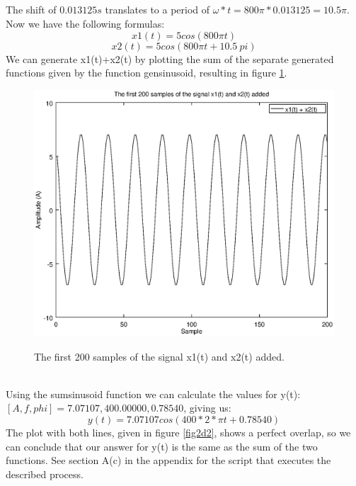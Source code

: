 \documentclass{article}
\begin{document}
\subsection{}
The shift of $0.013125s$ translates to a period of $\omega * t = 800\pi*0.013125 = 10.5\pi$. Now we have the following formulas:
\begin{equation}
    x1(t) = 5 cos(800\pi t)
\end{equation}
\begin{equation}
    x2(t) = 5 cos(800\pi t + 10.5\:pi)
\end{equation}
We can generate x1(t)+x2(t) by plotting the sum of the separate generated functions given by the function gensinusoid, resulting in figure \ref{fig2d1}.\\
\begin{figure}[H]
  \centering
  \includegraphics[width=.7\columnwidth]{plot4A.eps}\\
  \caption{The first 200 samples of the signal x1(t) and x2(t) added.}
  \label{fig2d1}
\end{figure}
\\
Using the sumsinusoid function we can calculate the values for y(t):\\
$[A, f, phi] = 7.07107,400.00000,0.78540$, giving us:
\begin{equation}
    y(t) = 7.07107 cos(400*2*\pi t + 0.78540)
\end{equation}
The plot with both lines, given in figure \ref{fig2d2}, shows a perfect overlap, so we can conclude that our answer for y(t) is the same as the sum of the two functions. See section A(c) in the appendix for the script that executes the described process.
\end{document}
